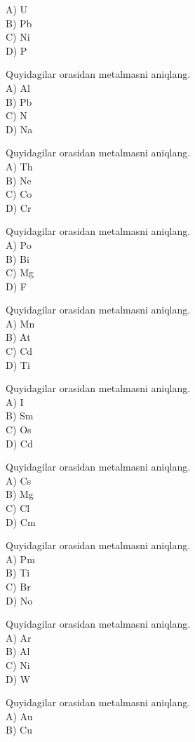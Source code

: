 A) U\\
B) Pb\\
C) Ni\\
D) P
  \item Quyidagilar orasidan metalmasni aniqlang.\\
A) Al\\
B) Pb\\
C) N\\
D) Na
  \item Quyidagilar orasidan metalmasni aniqlang.\\
A) Th\\
B) Ne\\
C) Co\\
D) Cr
  \item Quyidagilar orasidan metalmasni aniqlang.\\
A) Po\\
B) Bi\\
C) Mg\\
D) F
  \item Quyidagilar orasidan metalmasni aniqlang.\\
A) Mn\\
B) At\\
C) Cd\\
D) Ti
  \item Quyidagilar orasidan metalmasni aniqlang.\\
A) I\\
B) Sm\\
C) Os\\
D) Cd
  \item Quyidagilar orasidan metalmasni aniqlang.\\
A) Cs\\
B) Mg\\
C) Cl\\
D) Cm
  \item Quyidagilar orasidan metalmasni aniqlang.\\
A) Pm\\
B) Ti\\
C) Br\\
D) No
  \item Quyidagilar orasidan metalmasni aniqlang.\\
A) Ar\\
B) Al\\
C) Ni\\
D) W
  \item Quyidagilar orasidan metalmasni aniqlang.\\
A) Au\\
B) Cu\\
